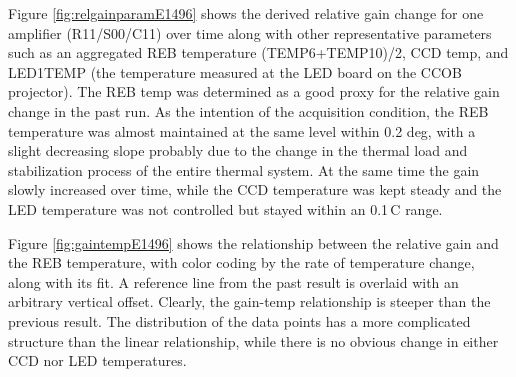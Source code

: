 Figure \ref{fig:relgainparamE1496} shows the derived 
 relative gain change for one amplifier (R11/S00/C11) over time along with other representative parameters such as an aggregated REB temperature (TEMP6+TEMP10)/2, CCD temp, and LED1TEMP (the temperature measured at the LED board on the CCOB projector). The REB temp was determined as a good proxy for the relative gain change in the past run.
 As the intention of the acquisition condition, the REB temperature was almost maintained at the same level within 0.2 deg, with a slight decreasing slope probably due to the change in the thermal load and stabilization process of the entire thermal system.
 At the same time the gain slowly increased over time, while the CCD temperature was kept steady and the LED temperature was not controlled but stayed within an 0.1\,C range.

 Figure \ref{fig:gaintempE1496} shows the relationship between the relative gain and the REB temperature, with color coding by the rate of temperature change, along with its fit. A reference line from the past result is overlaid with an arbitrary vertical offset. Clearly, the gain-temp relationship is steeper than the previous result. The distribution of the data points has a more complicated structure than the linear relationship, while there is no obvious change in either CCD nor LED temperatures. 




